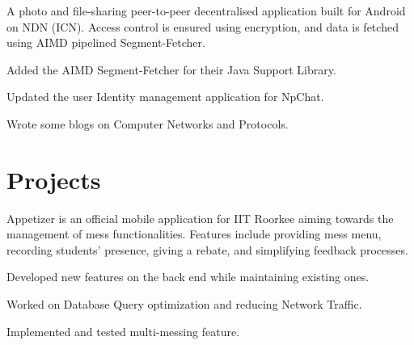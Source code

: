 \documentclass[letterpaper]{deedy-resume} %
\begin{document}
\begin{minipage}[t]{0.66\textwidth}
\sectionspace %

A photo and ﬁle-sharing peer-to-peer decentralised application built for Android on NDN (ICN). Access control is ensured using encryption, and data is fetched using AIMD pipelined Segment-Fetcher.
\begin{tightitemize}
\item Added the AIMD Segment-Fetcher for their Java Support Library.
\item Updated the user Identity management application for NpChat.
\end{tightitemize}

\sectionspace %

Wrote some blogs on Computer Networks and Protocols.


\sectionspace %


\section{Projects} 

Appetizer is an official mobile application for IIT Roorkee aiming towards the management of mess functionalities. Features include providing mess menu, recording students' presence, giving a rebate, and simplifying feedback processes.
\begin{tightitemize}
\item Developed new features on the back end while maintaining existing ones.
\item Worked on Database Query optimization and reducing Network Traffic.
\item Implemented and tested multi-messing feature.
\end{tightitemize}
\sectionspace %



\end{minipage}
\end{document}
